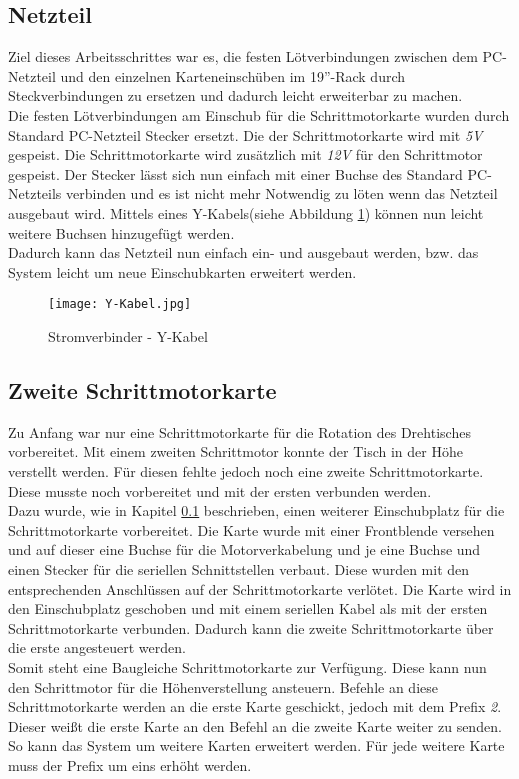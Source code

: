 \subsection{Netzteil}
\label{sec:Netzteil}
Ziel dieses Arbeitsschrittes war es, die festen Lötverbindungen zwischen dem PC-Netzteil und den einzelnen Karteneinschüben im 19''-Rack durch Steckverbindungen zu ersetzen und dadurch leicht erweiterbar zu machen.\\
Die festen Lötverbindungen am Einschub für die Schrittmotorkarte wurden durch Standard PC-Netzteil Stecker ersetzt. %
Die  der Schrittmotorkarte wird mit \emph{5V} gespeist. Die Schrittmotorkarte wird zusätzlich mit \emph{12V} für den Schrittmotor gespeist. Der Stecker lässt sich nun einfach mit einer Buchse des Standard PC-Netzteils verbinden und es ist nicht mehr Notwendig zu löten wenn das Netzteil ausgebaut wird. Mittels eines Y-Kabels(siehe Abbildung \ref{fig:Y-Kabel}) können nun leicht weitere Buchsen hinzugefügt werden.\\
Dadurch kann das Netzteil nun einfach ein- und ausgebaut werden, bzw. das System leicht um neue Einschubkarten erweitert werden.
\begin{figure}[h]
\centering
\texttt{[image: Y-Kabel.jpg]}
\caption{Stromverbinder - Y-Kabel\cite{kosatec}}
\label{fig:Y-Kabel}
\end{figure}

\subsection{Zweite Schrittmotorkarte}
Zu Anfang war nur eine Schrittmotorkarte für die Rotation des Drehtisches vorbereitet. Mit einem zweiten Schrittmotor konnte der Tisch in der Höhe verstellt werden. Für diesen fehlte jedoch noch eine zweite Schrittmotorkarte. Diese musste noch vorbereitet und mit der ersten verbunden werden.\\
Dazu wurde, wie in Kapitel \ref{sec:Netzteil} beschrieben, einen weiterer Einschubplatz für die Schrittmotorkarte vorbereitet. Die Karte wurde mit einer Frontblende versehen und auf dieser eine Buchse für die Motorverkabelung und je eine Buchse und einen Stecker für die seriellen Schnittstellen verbaut. Diese wurden mit den entsprechenden Anschlüssen auf der Schrittmotorkarte verlötet. Die Karte wird in den Einschubplatz geschoben und mit einem seriellen Kabel als  mit der ersten Schrittmotorkarte verbunden. Dadurch kann die zweite Schrittmotorkarte über die erste angesteuert werden.\\
Somit steht eine Baugleiche Schrittmotorkarte zur Verfügung. Diese kann nun den Schrittmotor für die Höhenverstellung ansteuern. Befehle an diese Schrittmotorkarte werden an die erste Karte geschickt, jedoch mit dem Prefix \emph{2}. Dieser weißt die erste Karte an den Befehl an die zweite Karte weiter zu senden. So kann das System um weitere Karten erweitert werden. Für jede weitere Karte muss der Prefix um eins erhöht werden.


